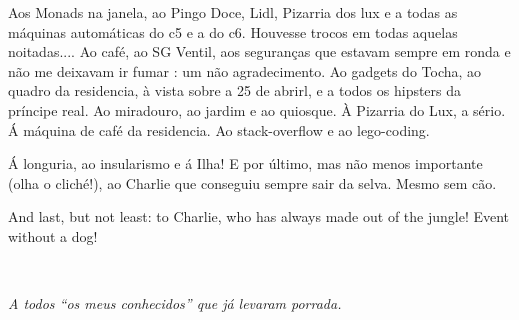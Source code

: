 Aos Monads na janela, ao Pingo Doce, Lidl, Pizarria dos lux e a todas as máquinas automáticas do c5 e a do c6. Houvesse trocos em todas aquelas noitadas.... Ao café, ao SG Ventil, aos seguranças que estavam sempre em ronda e não me deixavam ir fumar : um não agradecimento. Ao gadgets do Tocha, ao quadro da residencia, à vista sobre a 25 de abrirl, e a todos os hipsters da príncipe real. Ao miradouro, ao jardim e ao quiosque. À Pizarria do Lux, a sério. Á máquina de café da residencia. Ao stack-overflow e ao lego-coding. 



Á longuria, ao insularismo e  á Ilha! 
E por último, mas não menos importante (olha o cliché!), ao Charlie que conseguiu sempre sair da selva. Mesmo sem cão. 

And last, but not least: to Charlie, who has always made out of the jungle! Event without a dog! 
\LIMPA
\LIMPA

~
\vfill

\begin{flushright}\textit{A todos ``os meus conhecidos''  que já levaram porrada. }\end{flushright}

\LIMPA

